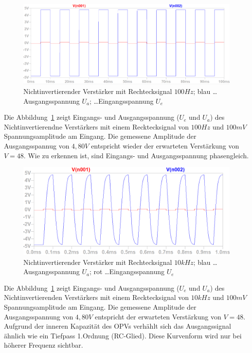 \documentclass[12pt,a4paper,titlepage]{article}
\begin{document}
\begin{figure}[H]
  \centering
  \includegraphics[width=150mm]{nichtinvertierend_pulse_eingangs_ausgangsspannung}
  \caption{Nichtinvertierender Verst\"arker mit Rechtecksignal $100Hz$; blau \dots Ausgangsspannung $U_a$; \dots Eingangsspannung $U_e$}
  \label{figure03}
\end{figure}
\noindent Die Abbildung~\ref{figure03} zeigt Eingangs- und Ausgangsspannung ($U_e$ und $U_a$) des Nichtinvertierendne Verst\"arkers mit einem Recktecksignal von $100Hz$ und $100mV$ Spannungsamplitude am Eingang. Die gemessene Amplitude der Ausgangsspannug von $4,80V$ entspricht wieder der erwarteten Verst\"arkung von $V = 48$. Wie zu erkennen ist, sind Eingangs- und Ausgangsspannung phasengleich.

\begin{figure}[H]
  \centering
  \includegraphics[width=150mm]{nichtinvertierend_pulse2_eingangs_ausgangsspannung}
  \caption{Nichtinvertierender Verst\"arker mit Rechtecksignal $10kHz$; blau \dots Ausgangsspannung $U_a$; rot \dots Eingangsspannung $U_e$}
  \label{figure04}
\end{figure}
\noindent Die Abbildung~\ref{figure03} zeigt Eingangs- und Ausgangsspannung ($U_e$ und $U_a$) des Nichtinvertierenden Verst\"arkers mit einem Recktecksignal von $10kHz$ und $100mV$ Spannungsamplitude am Eingang. Die gemessene Amplitude der Ausgangsspannung von $4,80V$ entspricht der erwarteten Verst\"arkung von $V = 48$. Aufgrund der inneren Kapazit\"at des OPVs verh\"ahlt sich das Ausgangssignal \"ahnlich wie ein Tiefpass 1.Ordnung (RC-Glied). Diese Kurvenform wird nur bei h\"oherer Frequenz sichtbar.
\end{document}
